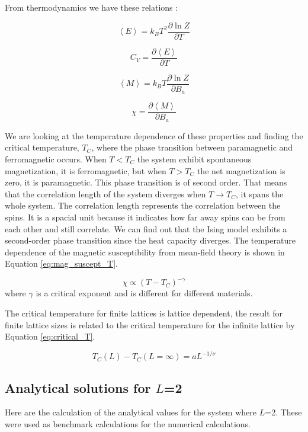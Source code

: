 From thermodynamics we have these relations \cite{thermal}:
\begin{multicols}{2}
\[
\left< E \right> = k_B T^2 \frac{\partial \ln Z}{\partial T}
\]

\[
C_V = \frac{\partial \left< E \right>  }{\partial T}
\]

\[
\left< M \right> = k_B T \frac{\partial \ln Z}{\partial B_a}
\]

\[
\chi = \frac{\partial \left< M \right>  }{\partial B_a}
\]
\end{multicols}
We are looking at the temperature dependence of these properties and finding the critical temperature, $T_C$,  where the phase transition between paramagnetic and ferromagnetic occurs. When $T< T_C$ the system exhibit spontaneous magnetization, it is ferromagnetic, but when $T > T_C$ the net magnetization is zero, it is paramagnetic. This phase transition is of second order. That means that the correlation length of the system diverges when $T \rightarrow T_C$, it spans the whole system. The correlation length represents the correlation between the spins. It is a spacial unit because it indicates how far away spins can be from each other and still correlate. We can find out that the Ising model exhibits a second-order phase transition since the heat capacity diverges. The temperature dependence of the magnetic susceptibility from mean-field theory is shown in Equation \ref{eq:mag_suscept_T}.

\begin{equation}\label{eq:mag_suscept_T}
\chi \propto (T-T_C)^{-\gamma}
\end{equation}
where $\gamma$ is a critical exponent and is different for different materials.

The critical temperature for finite lattices is lattice dependent, the result for finite lattice sizes is related to the critical temperature for the infinite lattice by Equation \ref{eq:critical_T}.

\begin{equation}\label{eq:critical_T}
T_C(L) - T_C(L=\infty) = a L^{-1/\nu}
\end{equation}

\subsection{Analytical solutions for $L$=2}\label{sec:analytical_sol}

Here are the calculation of the analytical values for the system where $L$=2. These were used as benchmark calculations for the numerical calculations.

